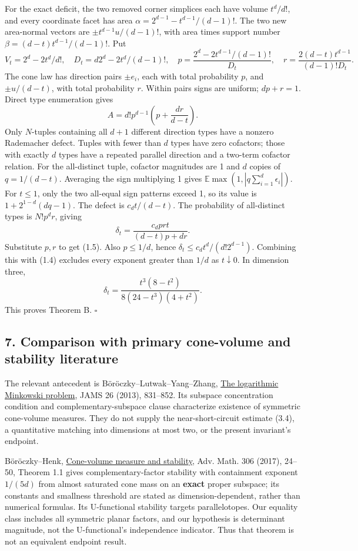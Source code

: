 \documentclass[
  11pt,
]{article}
\begin{document}
For the exact deficit, the two removed corner simplices each have volume
\(t^d/d!\), and every coordinate facet has area
\(\alpha=2^{d-1}-t^{d-1}/(d-1)!\). The two new area-normal vectors are
\(\pm t^{d-1}u/(d-1)!\), with area times support number
\(\beta=(d-t)t^{d-1}/(d-1)!\). Put \[
 V_t=2^d-2t^d/d!,\quad D_t=d2^d-2t^d/(d-1)!,\quad
 p=\frac{2^d-2t^{d-1}/(d-1)!}{D_t},\quad
 r=\frac{2(d-t)t^{d-1}}{(d-1)!D_t}.
\] The cone law has direction pairs \(\pm e_i\), each with total
probability \(p\), and \(\pm u/(d-t)\), with total probability \(r\).
Within pairs signs are uniform; \(dp+r=1\). Direct type enumeration
gives \[
 A=d!p^{d-1}\left(p+\frac{dr}{d-t}\right).
\] Only \(N\)-tuples containing all \(d+1\) different direction types
have a nonzero Rademacher defect. Tuples with fewer than \(d\) types
have zero cofactors; those with exactly \(d\) types have a repeated
parallel direction and a two-term cofactor relation. For the
all-distinct tuple, cofactor magnitudes are 1 and \(d\) copies of
\(q=1/(d-t)\). Averaging the sign multiplying 1 gives
\(\mathbb E\max(1,|q\sum_{i=1}^d\epsilon_i|)\). For \(t\le1\), only the
two all-equal sign patterns exceed 1, so its value is
\(1+2^{1-d}(dq-1)\). The defect is \(c_dt/(d-t)\). The probability of
all-distinct types is \(N!p^dr\), giving \[
 \delta_t=\frac{c_dprt}{(d-t)p+dr}.
\] Substitute \(p,r\) to get (1.5). Also \(p\le1/d\), hence
\(\delta_t\le c_dt^d/(d!2^{d-1})\). Combining this with (1.4) excludes
every exponent greater than \(1/d\) as \(t\downarrow0\). In dimension
three, \[
 \delta_t=\frac{t^3(8-t^2)}{8(24-t^3)(4+t^2)}.
\] This proves Theorem B. \(\square\)

\subsection{7. Comparison with primary cone-volume and stability
literature}\label{comparison-with-primary-cone-volume-and-stability-literature}

The relevant antecedent is Böröczky--Lutwak--Yang--Zhang,
\href{https://www.renyi.hu/~carlos/minkowski0-prob.pdf}{The logarithmic
Minkowski problem}, JAMS 26 (2013), 831--852. Its subspace concentration
condition and complementary-subspace clause characterize existence of
symmetric cone-volume measures. They do not supply the
near-short-circuit estimate (3.4), a quantitative matching into
dimensions at most two, or the present invariant's endpoint.

Böröczky--Henk,
\href{https://www.renyi.hu/~carlos/cone-volume-stability.pdf}{Cone-volume
measure and stability}, Adv. Math. 306 (2017), 24--50, Theorem 1.1 gives
complementary-factor stability with containment exponent \(1/(5d)\) from
almost saturated cone mass on an \textbf{exact} proper subspace; its
constants and smallness threshold are stated as dimension-dependent,
rather than numerical formulas. Its U-functional stability targets
parallelotopes. Our equality class includes all symmetric planar
factors, and our hypothesis is determinant magnitude, not the
U-functional's independence indicator. Thus that theorem is not an
equivalent endpoint result.
\end{document}
